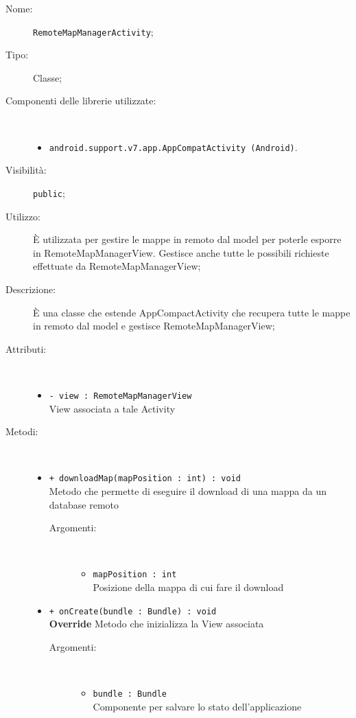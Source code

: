 \documentclass[../DefinizioneDiProdotto.tex]{subfiles}
\begin{document}
\begin{description}
	\item[Nome:] \texttt{RemoteMapManagerActivity};
	\item[Tipo:] Classe;
	\item[Componenti delle librerie utilizzate:] \
	\begin{itemize}
		\item \texttt{android.support.v7.app.AppCompatActivity (Android)}.
		
	\end{itemize}
	\item[Visibilità:] \texttt{public};
	\item[Utilizzo:] È utilizzata per gestire le mappe in remoto dal model per poterle esporre in RemoteMapManagerView. Gestisce anche tutte le possibili richieste effettuate da RemoteMapManagerView;
	\item[Descrizione:] È una classe che estende AppCompactActivity che recupera tutte le mappe in remoto dal model e gestisce RemoteMapManagerView;
	\item[Attributi:] \
	\begin{itemize}
		\item \texttt{- view : RemoteMapManagerView}\\
		View associata a tale Activity
		
	\end{itemize}
	\item[Metodi:] \
	\begin{itemize}
		\item \texttt{+ downloadMap(mapPosition : int) : void}\\
		Metodo che permette di eseguire il download di una mappa da un database remoto
		\begin{description}
			\item[Argomenti:] \
			\begin{itemize}
				\item \texttt{mapPosition : int}\\
				Posizione della mappa di cui fare il download\end{itemize}
		\end{description}
		\item \texttt{+ onCreate(bundle : Bundle) : void}\\
		\textbf{Override} Metodo che inizializza la View associata
		\begin{description}
			\item[Argomenti:] \
			\begin{itemize}
				\item \texttt{bundle : Bundle}\\
				Componente per salvare lo stato dell'applicazione\end{itemize}
		\end{description}
	\end{itemize}
\end{description}
\end{document}
